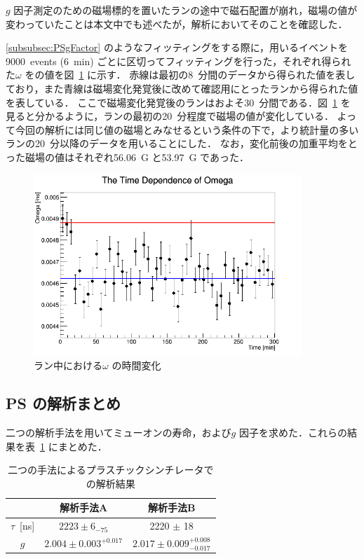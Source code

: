 $g$ 因子測定のための磁場標的を置いたランの途中で磁石配置が崩れ，磁場の値が変わっていたことは本文中でも述べたが，解析においてそのことを確認した．

\ref{subsubsec:PSgFactor} のようなフィッティングをする際に，用いるイベントを9000~events (6~min) ごとに区切ってフィッティングを行った，それぞれ得られた$\omega$ をの値を図~\ref{fig:PSOmegaCheck} に示す．
赤線は最初の8~分間のデータから得られた値を表しており，また青線は磁場変化発覚後に改めて確認用にとったランから得られた値を表している．
ここで磁場変化発覚後のランはおよそ30~分間である．図~\ref{fig:PSOmegaCheck} を見ると分かるように，ランの最初の20~分程度で磁場の値が変化している．
よって今回の解析には同じ値の磁場とみなせるという条件の下で，より統計量の多いランの20~分以降のデータを用いることにした．
なお，変化前後の加重平均をとった磁場の値はそれぞれ56.06~G と53.97~G であった．
\begin{figure}[h]
	\centering
	\includegraphics[width = 0.9\textwidth]{figure/odagawa/PSOmegaCheck.png}
	\caption{ラン中における$\omega$ の時間変化}
	\label{fig:PSOmegaCheck}
\end{figure}

\subsection{PS の解析まとめ}
\label{subsec:PSmatome}

二つの解析手法を用いてミューオンの寿命，および$g$ 因子を求めた．これらの結果を表~\ref{tab:matome_PS} にまとめた．
\begin{table}[h]
	\centering
	\caption{二つの手法によるプラスチックシンチレータでの解析結果}
	\begin{tabular}{ccc}\toprule
	{} & 解析手法A & 解析手法B \\ \midrule
	$\tau$~[ns]& $2223 \pm 6_{- 75}$ & 2220 $\pm$ 18\\
	$g$ & $2.004 \pm 0.003^{+0.017}$  & $2.017 \pm 0.009 ^{+0.008}_{-0.017}$\\ \bottomrule
	\end{tabular}\label{tab:matome_PS}
\end{table}%



%
